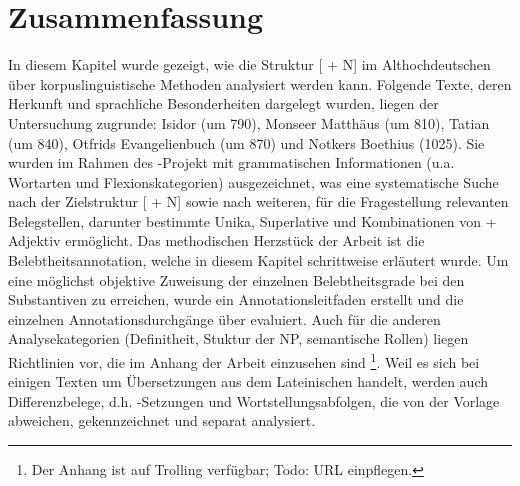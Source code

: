 \section{Zusammenfassung}

In diesem Kapitel wurde gezeigt, wie die Struktur [ + N] im Althochdeutschen über korpuslinguistische Methoden analysiert werden kann. Folgende Texte, deren Herkunft und sprachliche Besonderheiten dargelegt wurden, liegen der Untersuchung zugrunde: Isidor (um 790), Monseer Matthäus (um 810), Tatian (um 840), Otfrids Evangelienbuch (um 870) und Notkers Boethius (1025). Sie wurden im Rahmen des -Projekt mit grammatischen Informationen (u.a. Wortarten und Flexionskategorien) ausgezeichnet, was eine systematische Suche nach der Zielstruktur [ + N] sowie nach weiteren, für die Fragestellung relevanten Belegstellen, darunter bestimmte Unika, Superlative und Kombinationen von  + Adjektiv ermöglicht. Das methodischen Herzstück der Arbeit ist die Belebtheitsannotation, welche in diesem Kapitel schrittweise erläutert wurde. Um eine möglichst objektive Zuweisung der einzelnen Belebtheitsgrade bei den Substantiven zu erreichen, wurde ein Annotationsleitfaden erstellt und die einzelnen Annotationsdurchgänge über  evaluiert. Auch für die anderen Analysekategorien (Definitheit, Stuktur der NP, semantische Rollen) liegen Richtlinien vor, die im Anhang der Arbeit einzusehen sind \footnote{Der Anhang ist auf Trolling verfügbar; Todo: URL einpflegen.}. Weil es sich bei einigen Texten um Übersetzungen aus dem Lateinischen handelt, werden auch Differenzbelege, d.h. -Setzungen  und Wortstellungsabfolgen, die von der Vorlage abweichen, gekennzeichnet und separat analysiert. 
  
